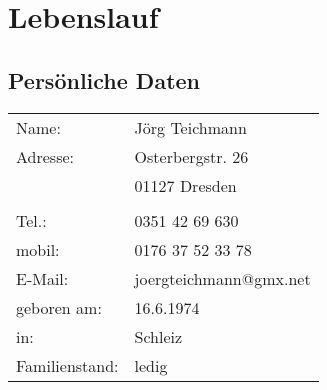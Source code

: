 \documentclass{article}
\begin{document}

\section*{Lebenslauf}

\begin{flushright}
\end{flushright}

\subsection*{Pers\"onliche Daten}
\begin{tabular}{lp{15cm}}
Name: 		& J\"org Teichmann\\
Adresse: 	& Osterbergstr. 26\\
	 	& 01127 Dresden\\
\\
Tel.:	 	& 0351 42 69 630 \\
mobil:	 	& 0176 37 52 33 78 \\
E-Mail:  	& joergteichmann@gmx.net \\
geboren am: 	& 16.6.1974\\
in:	    	& Schleiz\\
Familienstand: 	& ledig
\end{tabular}
\end{document}
